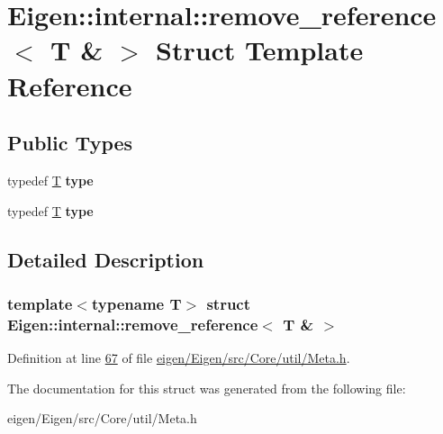 \hypertarget{struct_eigen_1_1internal_1_1remove__reference_3_01_t_01_6_01_4}{}\section{Eigen\+:\+:internal\+:\+:remove\+\_\+reference$<$ T \& $>$ Struct Template Reference}
\label{struct_eigen_1_1internal_1_1remove__reference_3_01_t_01_6_01_4}
\subsection*{Public Types}
\begin{DoxyCompactItemize}
\item 
\mbox{\label{struct_eigen_1_1internal_1_1remove__reference_3_01_t_01_6_01_4_aee4fe49c1eaa98fb0fcc4c2144e40ece}} 
typedef \hyperlink{group___sparse_core___module}{T} {\bfseries type}
\item 
\mbox{\label{struct_eigen_1_1internal_1_1remove__reference_3_01_t_01_6_01_4_aee4fe49c1eaa98fb0fcc4c2144e40ece}} 
typedef \hyperlink{group___sparse_core___module}{T} {\bfseries type}
\end{DoxyCompactItemize}


\subsection{Detailed Description}
\subsubsection*{template$<$typename T$>$\newline
struct Eigen\+::internal\+::remove\+\_\+reference$<$ T \& $>$}



Definition at line \hyperlink{eigen_2_eigen_2src_2_core_2util_2_meta_8h_source_l00067}{67} of file \hyperlink{eigen_2_eigen_2src_2_core_2util_2_meta_8h_source}{eigen/\+Eigen/src/\+Core/util/\+Meta.\+h}.



The documentation for this struct was generated from the following file\+:\begin{DoxyCompactItemize}
\item 
eigen/\+Eigen/src/\+Core/util/\+Meta.\+h\end{DoxyCompactItemize}
